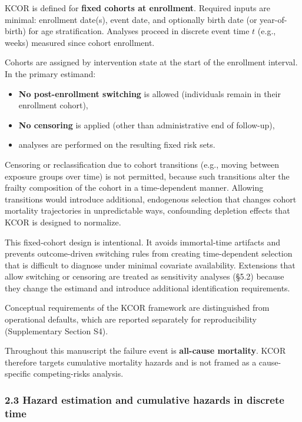 \documentclass[
]{article}
\providecommand{\tightlist}{%
  \setlength{\itemsep}{0pt}\setlength{\parskip}{0pt}}
\begin{document}
KCOR is defined for \textbf{fixed cohorts at enrollment}. Required
inputs are minimal: enrollment date(s), event date, and optionally birth
date (or year-of-birth) for age stratification. Analyses proceed in
discrete event time \(t\) (e.g., weeks) measured since cohort
enrollment.

Cohorts are assigned by intervention state at the start of the
enrollment interval. In the primary estimand:

\begin{itemize}
\tightlist
\item
  \textbf{No post-enrollment switching} is allowed (individuals remain
  in their enrollment cohort),
\item
  \textbf{No censoring} is applied (other than administrative end of
  follow-up),
\item
  analyses are performed on the resulting fixed risk sets.
\end{itemize}

Censoring or reclassification due to cohort transitions (e.g., moving
between exposure groups over time) is not permitted, because such
transitions alter the frailty composition of the cohort in a
time-dependent manner. Allowing transitions would introduce additional,
endogenous selection that changes cohort mortality trajectories in
unpredictable ways, confounding depletion effects that KCOR is designed
to normalize.

This fixed-cohort design is intentional. It avoids immortal-time
artifacts and prevents outcome-driven switching rules from creating
time-dependent selection that is difficult to diagnose under minimal
covariate availability. Extensions that allow switching or censoring are
treated as sensitivity analyses (§5.2) because they change the estimand
and introduce additional identification requirements.

Conceptual requirements of the KCOR framework are distinguished from
operational defaults, which are reported separately for reproducibility
(Supplementary Section S4).

Throughout this manuscript the failure event is \textbf{all-cause
mortality}. KCOR therefore targets cumulative mortality hazards and is
not framed as a cause-specific competing-risks analysis.

\subsubsection{2.3 Hazard estimation and cumulative hazards in discrete
time}\label{hazard-estimation-and-cumulative-hazards-in-discrete-time}
\end{document}
